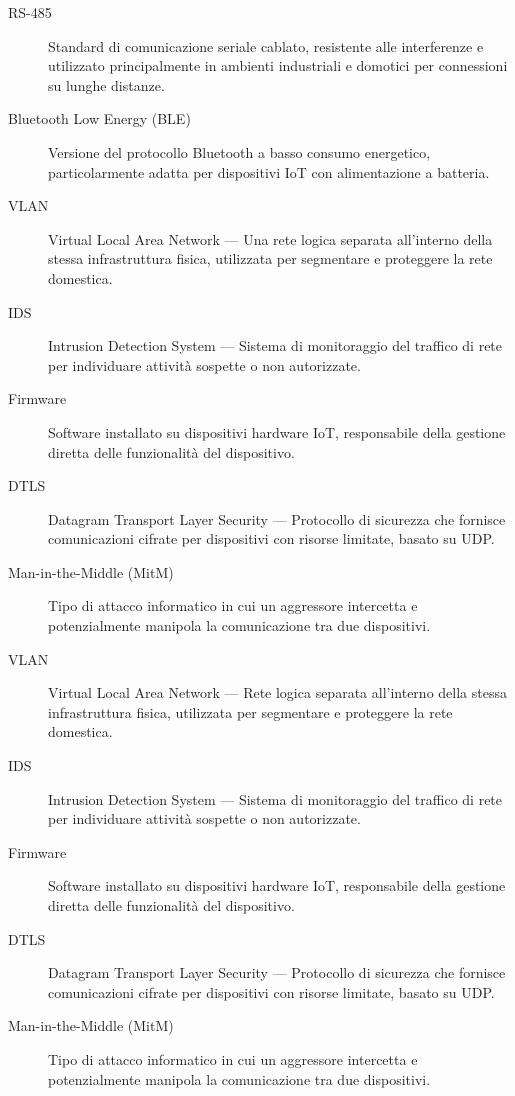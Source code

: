 \begin{description}
    \item[RS-485] Standard di comunicazione seriale cablato, resistente alle interferenze e utilizzato principalmente in ambienti industriali e domotici per connessioni su lunghe distanze.
    \item[Bluetooth Low Energy (BLE)] Versione del protocollo Bluetooth a basso consumo energetico, particolarmente adatta per dispositivi IoT con alimentazione a batteria.

    \item[VLAN] Virtual Local Area Network --- Una rete logica separata all'interno della stessa infrastruttura fisica, utilizzata per segmentare e proteggere la rete domestica.
    \item[IDS] Intrusion Detection System --- Sistema di monitoraggio del traffico di rete per individuare attività sospette o non autorizzate.
    \item[Firmware] Software installato su dispositivi hardware IoT, responsabile della gestione diretta delle funzionalità del dispositivo.
    \item[DTLS] Datagram Transport Layer Security --- Protocollo di sicurezza che fornisce comunicazioni cifrate per dispositivi con risorse limitate, basato su UDP.
    \item[Man-in-the-Middle (MitM)] Tipo di attacco informatico in cui un aggressore intercetta e potenzialmente manipola la comunicazione tra due dispositivi.


    \item[VLAN] Virtual Local Area Network --- Rete logica separata all’interno della stessa infrastruttura fisica, utilizzata per segmentare e proteggere la rete domestica.
    \item[IDS] Intrusion Detection System --- Sistema di monitoraggio del traffico di rete per individuare attività sospette o non autorizzate.
    \item[Firmware] Software installato su dispositivi hardware IoT, responsabile della gestione diretta delle funzionalità del dispositivo.
    \item[DTLS] Datagram Transport Layer Security --- Protocollo di sicurezza che fornisce comunicazioni cifrate per dispositivi con risorse limitate, basato su UDP.
    \item[Man-in-the-Middle (MitM)] Tipo di attacco informatico in cui un aggressore intercetta e potenzialmente manipola la comunicazione tra due dispositivi.

\end{description}